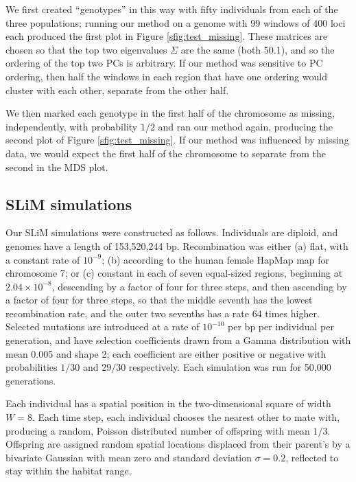 \documentclass[11pt, oneside]{article}   	%
\renewcommand{\llabel}[1]{\relax}
\begin{document}
We first created ``genotypes'' in this way with fifty individuals from each of the three populations;
running our method on a genome with 99 windows of 400 loci each
produced the first plot in Figure \ref{sfig:test_missing}.
These matrices are chosen so that the top two eigenvalues $\Sigma$ are the same (both 50.1),
and so the ordering of the top two PCs is arbitrary.
If our method was sensitive to PC ordering,
then half the windows in each region that have one ordering would cluster with each other,
separate from the other half. \llabel{ll:pc_switching_test}

We then marked each genotype in the first half of the chromosome
as missing, independently, with probability $1/2$ and ran our method again,
producing the second plot of Figure \ref{sfig:test_missing}. \llabel{ll:test_missing}
If our method was influenced by missing data,
we would expect the first half of the chromosome to separate from the second
in the MDS plot.

\subsection{SLiM simulations}
\label{apx:slim_sims}

Our SLiM simulations were constructed as follows.
Individuals are diploid, and genomes have a length of 153,520,244 bp.
Recombination was either 
(a) flat, with a constant rate of $10^{-9}$;
(b) according to the human female HapMap map for chromosome 7;
or (c) constant in each of seven equal-sized regions, beginning at $2.04\times 10^{-8}$,
descending by a factor of four for three steps, and then ascending by a factor of four for three steps,
so that the middle seventh has the lowest recombination rate,
and the outer two sevenths has a rate 64 times higher.
Selected mutations are introduced at a rate of $10^{-10}$ per bp per individual per generation,
and have selection coefficients drawn from a Gamma distribution with mean 0.005 and shape 2;
each coefficient are either positive or negative with probabilities $1/30$ and $29/30$ respectively.
Each simulation was run for 50,000 generations.

Each individual has a spatial position in the two-dimensional square of width $W=8$.
Each time step, each individual chooses the nearest other to mate with,             
producing a random, Poisson distributed number of offspring with mean $1/3$.
Offspring are assigned random spatial locations displaced from their parent's
by a bivariate Gaussian with mean zero and standard deviation $\sigma = 0.2$,
reflected to stay within the habitat range.
\end{document}
